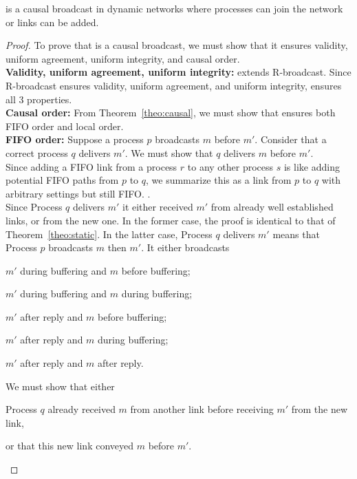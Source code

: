 \begin{lemma}
  \CBROADCAST is a causal broadcast in dynamic networks where processes can join
  the network or links can be added.
\end{lemma}

\begin{proof}
  To prove that \CBROADCAST is a causal broadcast, we must show that it ensures
  validity, uniform agreement, uniform integrity, and causal order. \\
  \textbf{Validity, uniform agreement, uniform integrity:} \CBROADCAST extends
  R-broadcast. Since R-broadcast ensures validity, uniform agreement, and uniform
  integrity, \CBROADCAST ensures all 3 properties. \\
  \textbf{Causal order:} From Theorem~\ref{theo:causal}, we must show
  that \CBROADCAST ensures both FIFO order and local order. \\
  \textbf{FIFO order:} Suppose a process $p$ broadcasts $m$ before
  $m'$. Consider that a correct process $q$ delivers $m'$. We must show that $q$
  delivers $m$ before $m'$. \\
  Since adding a FIFO link from a process $r$ to any other process $s$ is like
  adding potential FIFO paths from $p$ to $q$, we summarize this as a link from
  $p$ to $q$ with arbitrary settings but still FIFO.  . \\
  Since Process $q$ delivers $m'$ it either received $m'$ from already well
  established links, or from the new one. In the former case, the proof is
  identical to that of Theorem~\ref{theo:static}. In the latter case, Process
  $q$ delivers $m'$ means that Process $p$ broadcasts $m$ then $m'$. It either
  broadcasts
  \begin{inparaenum}[(i)]
  \item \label{case:one} $m'$ during buffering and $m$ before buffering;
  \item \label{case:two} $m'$ during buffering and $m$ during buffering;
  \item \label{case:three} $m'$ after reply and $m$ before buffering;
  \item \label{case:four} $m'$ after reply and $m$ during buffering;
  \item \label{case:five} $m'$ after reply and $m$ after reply.
  \end{inparaenum}
  We must show that either 
  \begin{inparaenum}[(1)]
  \item \label{show:one} Process $q$ already received $m$ from another link
    before receiving $m'$ from the new link,
  \item \label{show:two} or that this new link conveyed $m$ before $m'$.
  \end{inparaenum}


\end{proof}
